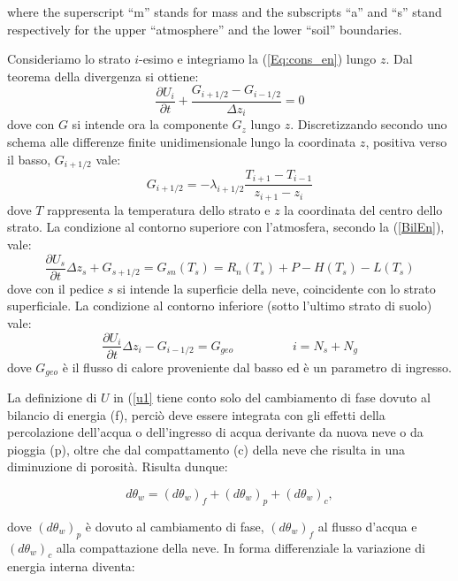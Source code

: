 where the superscript ``m'' stands for mass and the subscripts ``a'' and ``s'' stand respectively for the upper ``atmosphere'' and the lower ``soil'' boundaries.


Consideriamo lo strato $i$-esimo e integriamo la (\ref{Eq:cons_en}) lungo $z$. Dal teorema della divergenza si ottiene:
\begin{equation}\label{Eq:En_lay_i}
\frac{\partial U_i}{\partial t} + \frac{G_{i+1/2}-G_{i-1/2}}{\Delta z_i} =0
\end{equation}
%
dove con $G$ si intende ora la componente $G_z$ lungo $z$. Discretizzando secondo uno schema alle differenze finite unidimensionale lungo la coordinata $z$, positiva verso il basso, $G_{i+1/2}$ vale:
\begin{equation}\label{}
G_{i+1/2}=-\lambda_{i+1/2} \frac{T_{i+1}-T_{i-1}}{z_{i+1}-z_i}
\end{equation}
dove $T$ rappresenta la temperatura dello strato e $z$ la coordinata del centro dello strato.
La condizione al contorno superiore con l'atmosfera, secondo la (\ref{BilEn}), vale:
\begin{equation}\label{Eq:cond_sup}
\frac{\partial U_s}{\partial t}\Delta z_s+ G_{s+1/2} = G_{sn}(T_s)= R_n(T_s)+P-H(T_s)-L(T_s)
\end{equation}
% 
dove con il pedice $s$ si intende la superficie della neve, coincidente con lo strato superficiale.
La condizione al contorno inferiore (sotto l'ultimo strato di suolo) vale:
\begin{equation}\label{Eq:cond_inf}
\frac{\partial U_i}{\partial t}\Delta z_i- G_{i-1/2} =G_{geo} \hspace{2cm} i=N_s+N_g
\end{equation}
dove $G_{geo}$ \`e il flusso di calore proveniente dal basso ed \`e un parametro di ingresso.


La definizione di $U$ in (\ref{u1} tiene conto solo del cambiamento di fase dovuto al bilancio di energia (f), perci\`o deve essere integrata con gli effetti della percolazione dell'acqua o dell'ingresso di acqua derivante da nuova neve o da pioggia (p), oltre che dal compattamento (c) della neve che risulta in una diminuzione di porosit\`a. Risulta dunque:

\begin{equation}
d\theta_w=(d\theta_w)_{f}+(d\theta_w)_{p}+(d\theta_w)_{c},
\end{equation}

\noindent dove $(d\theta_w)_{p}$ \`e dovuto al cambiamento di fase, $(d\theta_w)_{f}$ al flusso d'acqua e $(d\theta_w)_{c}$ alla compattazione della neve. In forma differenziale la variazione di energia interna diventa:

